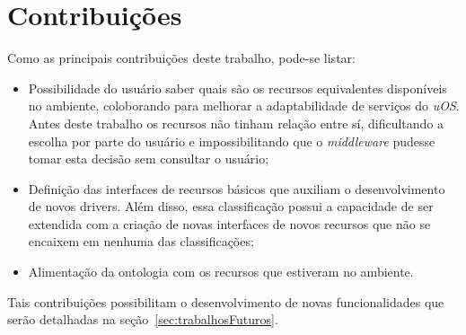 \section{Contribuições}

Como as principais contribuições deste trabalho, pode-se listar:

\begin{itemize}
	\item Possibilidade do usuário saber quais são os recursos equivalentes disponíveis no ambiente, coloborando para melhorar a adaptabilidade de serviços do \emph{uOS}. Antes deste trabalho os recursos não tinham relação entre sí, dificultando a escolha por parte do usuário e impossibilitando que o \emph{middleware} pudesse tomar esta decisão sem consultar o usuário;
	\item Definição das interfaces de recursos básicos que auxiliam o desenvolvimento de novos drivers. Além disso, essa classificação possui a capacidade de ser extendida com a criação de novas interfaces de novos recursos que não se encaixem em nenhuma das classificações;
	\item Alimentação da ontologia com os recursos que estiveram no ambiente.
\end{itemize}

Tais contribuições possibilitam o desenvolvimento de novas funcionalidades que serão detalhadas na seção~\ref{sec:trabalhosFuturos}.
